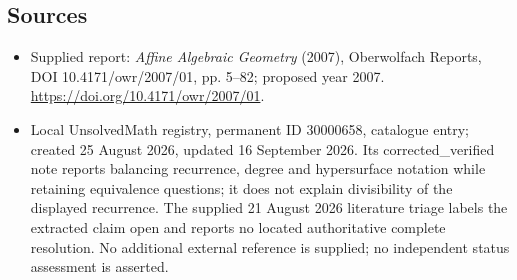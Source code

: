 \documentclass[11pt]{article}
\begin{document}
\subsection{Sources}
\begin{itemize}
\item Supplied report: \emph{Affine Algebraic Geometry} (2007), Oberwolfach Reports, DOI 10.4171/owr/2007/01, pp. 5--82; proposed year 2007. \url{https://doi.org/10.4171/owr/2007/01}.
\item Local UnsolvedMath registry, permanent ID 30000658, catalogue entry; created 25 August 2026, updated 16 September 2026. Its corrected\_verified note reports balancing recurrence, degree and hypersurface notation while retaining equivalence questions; it does not explain divisibility of the displayed recurrence. The supplied 21 August 2026 literature triage labels the extracted claim open and reports no located authoritative complete resolution. No additional external reference is supplied; no independent status assessment is asserted.
\end{itemize}
\end{document}
